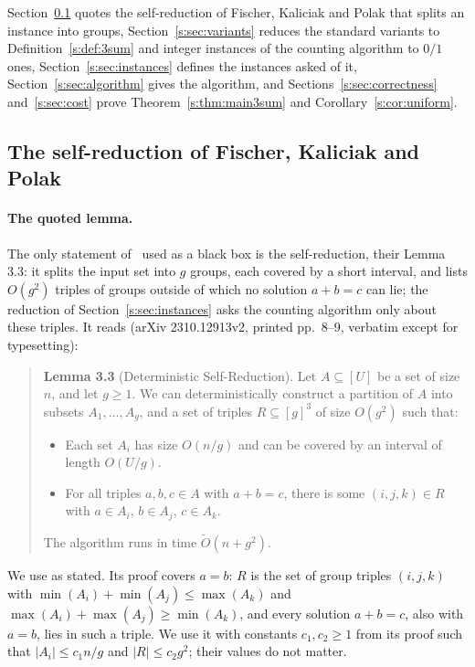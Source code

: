 \documentclass[11pt]{article}
\theoremstyle{definition}
\theoremstyle{remark}
\begin{document}
Section~\ref{s:sec:quoted} quotes the self-reduction of Fischer, Kaliciak and Polak that splits an instance into groups, Section~\ref{s:sec:variants} reduces the standard variants to Definition~\ref{s:def:3sum} and integer instances of the counting algorithm to $0/1$ ones, Section~\ref{s:sec:instances} defines the instances asked of it, Section~\ref{s:sec:algorithm} gives the algorithm, and Sections~\ref{s:sec:correctness} and~\ref{s:sec:cost} prove Theorem~\ref{s:thm:main3sum} and Corollary~\ref{s:cor:uniform}.

\subsection{The self-reduction of Fischer, Kaliciak and Polak}\label{s:sec:quoted}

\paragraph{The quoted lemma.} The only statement of~\cite{FKP24} used as a black box is the self-reduction, their Lemma 3.3: it splits the input set into $g$ groups, each covered by a short interval, and lists $O(g^2)$ triples of groups outside of which no solution $a+b=c$ can lie; the reduction of Section~\ref{s:sec:instances} asks the counting algorithm only about these triples. It reads (arXiv 2310.12913v2, printed pp.~8--9, verbatim except for typesetting):
\begin{quote}
\textbf{Lemma 3.3} (Deterministic Self-Reduction). Let $A\subseteq[U]$ be a set of size $n$, and let $g\ge1$. We can deterministically construct a partition of $A$ into subsets $A_1,\dots,A_g$, and a set of triples $R\subseteq[g]^3$ of size $O(g^2)$ such that:
\begin{itemize}[nosep]
\item Each set $A_i$ has size $O(n/g)$ and can be covered by an interval of length $O(U/g)$.
\item For all triples $a,b,c\in A$ with $a+b=c$, there is some $(i,j,k)\in R$ with $a\in A_i$, $b\in A_j$, $c\in A_k$.
\end{itemize}
The algorithm runs in time $\tilde O(n+g^2)$.
\end{quote}
We use \cite[Lemma~3.3]{FKP24} as stated. Its proof covers $a=b$: $R$ is the set of group triples $(i,j,k)$ with $\min(A_i)+\min(A_j)\le\max(A_k)$ and $\max(A_i)+\max(A_j)\ge\min(A_k)$, and every solution $a+b=c$, also with $a=b$, lies in such a triple. We use it with constants $c_1,c_2\ge1$ from its proof such that $|A_i|\le c_1n/g$ and $|R|\le c_2g^2$; their values do not matter.
\end{document}

